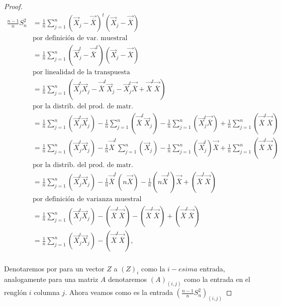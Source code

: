 \documentclass[letterpaper]{article}
\theoremstyle{definition}
\theoremstyle{lemathm}
\theoremstyle{lemademthm}
\newcommand{\pars}[1]{\left( #1 \right) }
\newcommand{\1}{\mathbbm{1}}
\begin{document}
\begin{enumerate}
\begin{itemize}
\begin{proof}
                \begin{align*}
                    \frac{n-1}{n} S_n^2 &= \frac{1}{n}\sum_{j=1}^n \pars{\vec{X}_j-\vec{\overline{X}}}^t \pars{\vec{X}_j-\vec{\overline{X}}}\\ &\text{por definición de var. muestral}\\
                    &= \frac{1}{n}\sum_{j=1}^n \pars{\vec{X}_j^t-\vec{\overline{X}}^t} \pars{\vec{X}_j-\vec{\overline{X}}}\\ &\text{por linealidad de la transpuesta}\\
                    &= \frac{1}{n}\sum_{j=1}^n \pars{\vec{X}_j^t\vec{X}_j - \vec{\overline{X}}^t\vec{X}_j - \vec{X}_j^t\vec{\overline{X}} + \vec{\overline{X}}^t\vec{\overline{X}}}\\  &\text{por la distrib. del prod. de matr.}\\
                    &= \frac{1}{n}\sum_{j=1}^n \pars{\vec{X}_j^t\vec{X}_j} - \frac{1}{n}\sum_{j=1}^n \pars{\vec{\overline{X}}^t\vec{X}_j} - \frac{1}{n}\sum_{j=1}^n \pars{\vec{X}_j^t\vec{\overline{X}}} + \frac{1}{n}\sum_{j=1}^n \pars{\vec{\overline{X}}^t\vec{\overline{X}}}\\
					&= \frac{1}{n}\sum_{j=1}^n \pars{\vec{X}_j^t\vec{X}_j} - \frac{1}{n}\vec{\overline{X}}^t\sum_{j=1}^n \pars{\vec{X}_j} - \frac{1}{n}\sum_{j=1}^n \pars{\vec{X}_j^t}\vec{\overline{X}} + \frac{1}{n}\sum_{j=1}^n \pars{\vec{\overline{X}}^t\vec{\overline{X}}}\\ &\text{por la distrib. del prod. de matr.}\\
					&= \frac{1}{n}\sum_{j=1}^n \pars{\vec{X}_j^t\vec{X}_j} - \frac{1}{n}\vec{\overline{X}}^t\pars{n\vec{\overline{X}}} - \frac{1}{n}\pars{n\vec{\overline{X}}^t}\vec{\overline{X}} + \pars{\vec{\overline{X}}^t\vec{\overline{X}}}\\ &\text{por definición de varianza muestral}\\
					&= \frac{1}{n}\sum_{j=1}^n \pars{\vec{X}_j^t\vec{X}_j} - \pars{\vec{\overline{X}}^t\vec{\overline{X}}} - \pars{\vec{\overline{X}}^t\vec{\overline{X}}} + \pars{\vec{\overline{X}}^t\vec{\overline{X}}}\\
					&= \frac{1}{n}\sum_{j=1}^n \pars{\vec{X}_j^t\vec{X}_j} - \pars{\vec{\overline{X}}^t\vec{\overline{X}}},\\
				\end{align*}
				
				Denotaremos por para un vector $Z$ a $(Z)_i$ como la $i-esima$ entrada, analogamente para una matriz $A$ denotaremos $(A)_{(i,j)}$ como la entrada en el renglón $i$ columna $j$. Ahora veamos como es la entrada $\pars{\frac{n-1}{n}S_n^2}_{(i,j)}$


\end{proof}
\end{itemize}
\end{enumerate}
\end{document}
